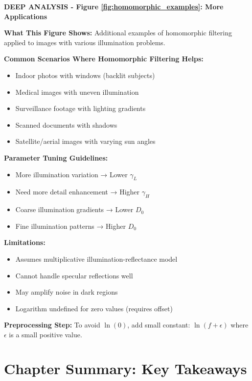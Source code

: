 \documentclass[12pt,a4paper]{article}
\begin{document}
\begin{deepexplanation}
\textbf{DEEP ANALYSIS - Figure \ref{fig:homomorphic_examples}: More Applications}

\textbf{What This Figure Shows:}
Additional examples of homomorphic filtering applied to images with various illumination problems.

\textbf{Common Scenarios Where Homomorphic Filtering Helps:}
\begin{itemize}
    \item Indoor photos with windows (backlit subjects)
    \item Medical images with uneven illumination
    \item Surveillance footage with lighting gradients
    \item Scanned documents with shadows
    \item Satellite/aerial images with varying sun angles
\end{itemize}

\textbf{Parameter Tuning Guidelines:}
\begin{itemize}
    \item More illumination variation → Lower $\gamma_L$
    \item Need more detail enhancement → Higher $\gamma_H$
    \item Coarse illumination gradients → Lower $D_0$
    \item Fine illumination patterns → Higher $D_0$
\end{itemize}

\textbf{Limitations:}
\begin{itemize}
    \item Assumes multiplicative illumination-reflectance model
    \item Cannot handle specular reflections well
    \item May amplify noise in dark regions
    \item Logarithm undefined for zero values (requires offset)
\end{itemize}

\textbf{Preprocessing Step:}
To avoid $\ln(0)$, add small constant: $\ln(f + \epsilon)$ where $\epsilon$ is a small positive value.
\end{deepexplanation}

\section{Chapter Summary: Key Takeaways}
\end{document}
